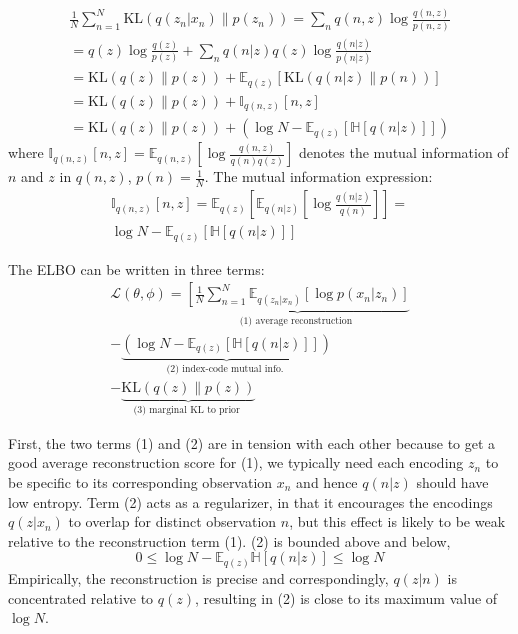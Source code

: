 \documentclass[5p,sort&compress]{elsarticle}
\begin{document}
\begin{equation}
\begin{aligned} \frac{1}{N} \sum_{n=1}^{N} \mathrm{KL}\left(q\left(z_{n} | x_{n}\right) \| p\left(z_{n}\right)\right) =\sum_{n} q(n, z) \log \frac{q(n, z)}{p(n, z)} \\ = q(z) \log \frac{q(z)}{p(z)} + \sum_{n} q(n|z) q(z) \log \frac{q(n|z)}{p(n|z)}\\
=\mathrm{KL}(q(z) \| p(z))+\mathbb{E}_{q(z)}[\mathrm{KL}(q(n | z) \| p(n))] \\ 
= \mathrm{KL}(q(z) \| p(z)) + \mathbb{I}_{q(n, z)}[n, z] \\ =\mathrm{KL}(q(z) \| p(z))+\left(\log N-\mathbb{E}_{q(z)}[\mathbb{H}[q(n | z)]]\right) \end{aligned}
\end{equation}
where $\mathbb{I}_{q(n, z)}[n, z]=\mathbb{E}_{q(n, z)}\left[\log \frac{q(n, z)}{q(n) q(z)}\right]$ denotes the mutual information of $n$ and $z$ in $q(n,z)$, $p(n) = \frac{1}{N}$. The mutual information expression:
\begin{equation}
\begin{aligned}
\mathbb{I}_{q(n, z)}[n, z]=\mathbb{E}_{q(z)}\left[\mathbb{E}_{q(n | z)}\left[\log \frac{q(n | z)}{q(n)}\right]\right]= \\
\log N-\mathbb{E}_{q(z)}[\mathbb{H}[q(n | z)]]
\end{aligned}
\end{equation}

The ELBO can be written in three terms:
\begin{equation}
\begin{aligned}
\mathcal{L}(\theta, \phi)=\underbrace{\left[\frac{1}{N} \sum_{n=1}^{N} \mathbb{E}_{q\left(z_{n} | x_{n}\right)}\left[\log p\left(x_{n} | z_{n}\right)\right]\right.}_{\text {(1) average reconstruction }} \\
- \underbrace{\left(\log N-\mathbb{E}_{q(z)}[\mathbb{H}[q(n | z)]]\right)}_{\text {(2) index-code mutual info. }} \\
- \underbrace{\mathrm{KL}(q(z) \| p(z))}_{\text {(3) marginal KL to prior }}
\end{aligned}
\end{equation}

First, the two terms (1) and (2) are in tension with each other because to get a good average reconstruction score for (1), we typically need each encoding $z_n$ to be specific to its corresponding observation $x_n$ and hence $q(n|z)$ should have low entropy. Term (2) acts as a regularizer, in that it encourages the encodings $q(z|x_n)$ to overlap for distinct observation $n$, but this effect is likely to be weak relative to the reconstruction term (1). (2) is bounded above and below,
\begin{equation}
0 \leq \log N-\mathbb{E}_{q(z)} \mathbb{H}[q(n | z)] \leq \log N
\end{equation}
Empirically, the reconstruction is precise and correspondingly, $q(z|n)$ is concentrated relative to $q(z)$, resulting in (2) is close to its maximum value of $\log N$.
\end{document}
